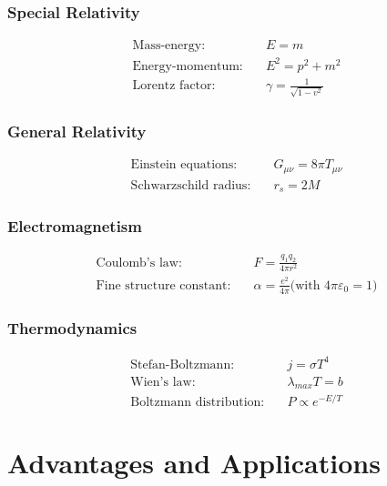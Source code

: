 	\subsubsection{Special Relativity}
	\begin{align}
		\text{Mass-energy:} \quad & E = m \\
		\text{Energy-momentum:} \quad & E^2 = p^2 + m^2 \\
		\text{Lorentz factor:} \quad & \gamma = \frac{1}{\sqrt{1-v^2}}
	\end{align}
	
	\subsubsection{General Relativity}
	\begin{align}
		\text{Einstein equations:} \quad & G_{\mu\nu} = 8\pi T_{\mu\nu} \\
		\text{Schwarzschild radius:} \quad & r_s = 2M
	\end{align}
	
	\subsubsection{Electromagnetism}
	\begin{align}
		\text{Coulomb's law:} \quad & F = \frac{q_1 q_2}{4\pi r^2} \\
		\text{Fine structure constant:} \quad & \alpha = \frac{e^2}{4\pi}
		\text{(with } 4\pi\varepsilon_0 = 1\text{)}
	\end{align}
	
	\subsubsection{Thermodynamics}
	\begin{align}
		\text{Stefan-Boltzmann:} \quad & j = \sigma T^4 \\
		\text{Wien's law:} \quad & \lambda_{max} T = b \\
		\text{Boltzmann distribution:} \quad & P \propto e^{-E/T}
	\end{align}
	
	\section{Advantages and Applications}
	
